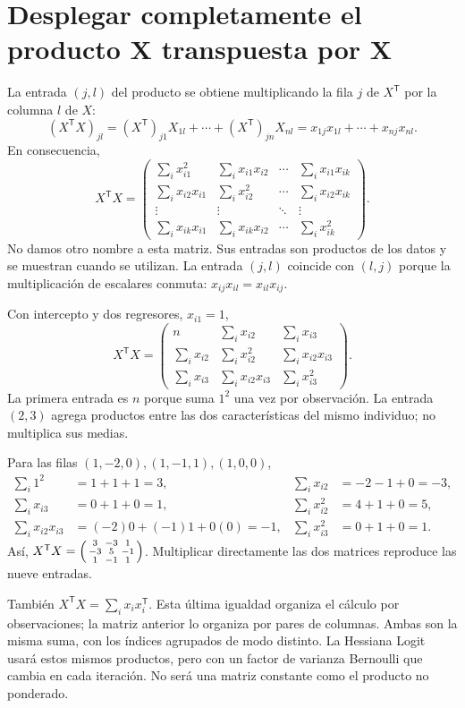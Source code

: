 \documentclass[11pt,a4paper]{article}
\newcommand{\T}{^{\mathsf T}}
\begin{document}
\section{Desplegar completamente el producto X transpuesta por X}\label{logit9}
La entrada $(j,l)$ del producto se obtiene multiplicando la fila $j$
de $X\T$ por la columna $l$ de $X$:
\[
(X\T X)_{jl}
=(X\T)_{j1}X_{1l}+\cdots+(X\T)_{jn}X_{nl}
=x_{1j}x_{1l}+\cdots+x_{nj}x_{nl}.
\]
En consecuencia,
\[
X\T X=
\begin{pmatrix}
\sum_i x_{i1}^2&\sum_i x_{i1}x_{i2}&\cdots&\sum_i x_{i1}x_{ik}\\
\sum_i x_{i2}x_{i1}&\sum_i x_{i2}^2&\cdots&\sum_i x_{i2}x_{ik}\\
\vdots&\vdots&\ddots&\vdots\\
\sum_i x_{ik}x_{i1}&\sum_i x_{ik}x_{i2}&\cdots&\sum_i x_{ik}^2
\end{pmatrix}.
\]
No damos otro nombre a esta matriz. Sus entradas son productos de los
datos y se muestran cuando se utilizan.
La entrada $(j,l)$ coincide con $(l,j)$ porque la multiplicación
de escalares conmuta: $x_{ij}x_{il}=x_{il}x_{ij}$.

Con intercepto y dos regresores, $x_{i1}=1$,
\[
X\T X=
\begin{pmatrix}
n&\sum_i x_{i2}&\sum_i x_{i3}\\
\sum_i x_{i2}&\sum_i x_{i2}^2&\sum_i x_{i2}x_{i3}\\
\sum_i x_{i3}&\sum_i x_{i2}x_{i3}&\sum_i x_{i3}^2
\end{pmatrix}.
\]
La primera entrada es $n$ porque suma $1^2$ una vez por observación.
La entrada $(2,3)$ agrega productos entre las dos características del
mismo individuo; no multiplica sus medias.

\begin{ejemplo}
Para las filas $(1,-2,0),(1,-1,1),(1,0,0)$,
\[
\begin{aligned}
\sum_i1^2&=1+1+1=3,&\sum_i x_{i2}&=-2-1+0=-3,\\
\sum_i x_{i3}&=0+1+0=1,&\sum_i x_{i2}^2&=4+1+0=5,\\
\sum_i x_{i2}x_{i3}&=(-2)0+(-1)1+0(0)=-1,&
\sum_i x_{i3}^2&=0+1+0=1.
\end{aligned}
\]
Así,
$X\T X=\begin{psmallmatrix}3&-3&1\\-3&5&-1\\1&-1&1\end{psmallmatrix}$.
Multiplicar directamente las dos matrices reproduce las nueve entradas.
\end{ejemplo}
También
$X\T X=\sum_i x_ix_i\T$.
Esta última igualdad organiza el cálculo por observaciones;
la matriz anterior lo organiza por pares de columnas.
Ambas son la misma suma, con los índices agrupados de modo distinto.
La Hessiana Logit usará estos mismos productos, pero con un factor
de varianza Bernoulli que cambia en cada iteración.
No será una matriz constante como el producto no ponderado.
\end{document}
